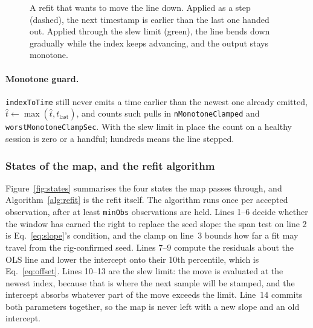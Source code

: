 \documentclass[11pt,a4paper]{article}
\newcommand{\code}[1]{\texttt{\small #1}}
\begin{document}
\begin{figure}[htbp]
\centering
{}
\caption{A refit that wants to move the line down. Applied as a step (dashed),
the next timestamp is earlier than the last one handed out. Applied through the
slew limit (green), the line bends down gradually while the index keeps
advancing, and the output stays monotone.}
\label{fig:slew}
\end{figure}

\paragraph{Monotone guard.} \code{indexToTime} still never emits a time earlier
than the newest one already emitted,
$\hat t \leftarrow \max(\hat t, t_{\text{last}})$, and counts such pulls in
\code{nMonotoneClamped} and \code{worstMonotoneClampSec}. With the slew limit in
place the count on a healthy session is zero or a handful; hundreds means the
line stepped.

\subsubsection{States of the map, and the refit algorithm}

Figure~\ref{fig:states} summarises the four states the map passes through, and
Algorithm~\ref{alg:refit} is the refit itself. The algorithm runs once per
accepted observation, after at least \code{minObs} observations are held. Lines
1--6 decide whether the window has earned the right to replace the seed slope:
the span test on line 2 is Eq.~\eqref{eq:slope}'s condition, and the clamp on
line~3 bounds how far a fit may travel from the rig-confirmed seed. Lines 7--9
compute the residuals about the OLS line and lower the intercept onto their
10th percentile, which is Eq.~\eqref{eq:offset}. Lines 10--13 are the slew
limit: the move is evaluated at the newest index, because that is where the
next sample will be stamped, and the intercept absorbs whatever part of the
move exceeds the limit. Line~14 commits both parameters together, so the map
is never left with a new slope and an old intercept.
\end{document}
